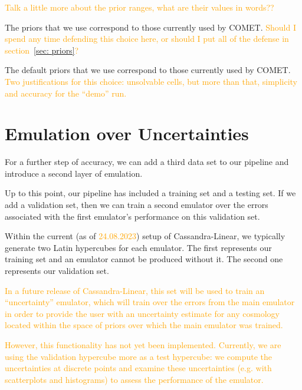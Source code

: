\textcolor{orange}{Talk a little more about the prior ranges, what are their
values in words??}

The priors that we use correspond to those currently used by COMET. \textcolor{orange}{Should I spend any time defending this choice here, or should I put all of the defense in section~\ref{sec: priors}?}

The default priors that we use correspond to those currently used by COMET. \textcolor{orange}{Two
justifications for this choice: unsolvable cells, but more than that, simplicity and accuracy
for the ``demo'' run.}

\section{Emulation over Uncertainties}

For a further step of accuracy, we can add a third data set to our pipeline
and introduce a second layer of emulation.

Up to this point, our pipeline has included a training set and a testing set.
If we add a validation set, then we can train a second emulator over the
errors associated with the first emulator's performance on this validation
set.

Within the current (as of \textcolor{orange}{24.08.2023}) setup of
Cassandra-Linear, we typically generate two Latin hypercubes for each
emulator. The first represents our training set and an emulator cannot be
produced without it. The second one represents our validation set.

\textcolor{orange}{In a future
release of Cassandra-Linear, this set will be used to train an ``uncertainty''
emulator, which will train over the errors from the main emulator in order to
provide the user with an uncertainty estimate for any cosmology located within
the space of priors over which the main emulator was trained.} 

\textcolor{orange}{However, this functionality has not yet been implemented. 
Currently, we are 
using the validation hypercube more as a test hypercube: we compute the uncertainties at discrete points and examine these uncertainties (e.g. with
scatterplots and histograms) to assess the performance of the emulator.}
